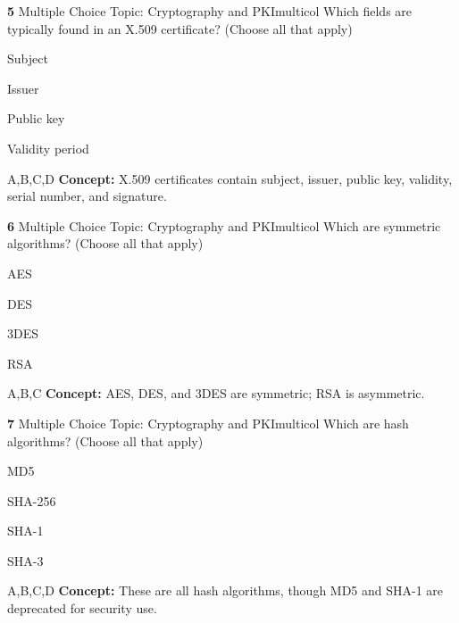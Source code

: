 \documentclass[10pt,a4paper]{article}
\begin{document}
\begin{qcard}{\color{white}\textbf{5} \hfill \small Multiple Choice \textbar{} Topic: Cryptography and PKI}{multicol}
Which fields are typically found in an X.509 certificate? (Choose all that apply)

\begin{qoptions}
\item Subject
\item Issuer
\item Public key
\item Validity period
\end{qoptions}
\begin{explainbox}{A,B,C,D}
\textbf{Concept:} X.509 certificates contain subject, issuer, public key, validity, serial number, and signature.
\end{explainbox}
\end{qcard}

\begin{qcard}{\color{white}\textbf{6} \hfill \small Multiple Choice \textbar{} Topic: Cryptography and PKI}{multicol}
Which are symmetric algorithms? (Choose all that apply)

\begin{qoptions}
\item AES
\item DES
\item 3DES
\item RSA
\end{qoptions}
\begin{explainbox}{A,B,C}
\textbf{Concept:} AES, DES, and 3DES are symmetric; RSA is asymmetric.
\end{explainbox}
\end{qcard}

\begin{qcard}{\color{white}\textbf{7} \hfill \small Multiple Choice \textbar{} Topic: Cryptography and PKI}{multicol}
Which are hash algorithms? (Choose all that apply)

\begin{qoptions}
\item MD5
\item SHA-256
\item SHA-1
\item SHA-3
\end{qoptions}
\begin{explainbox}{A,B,C,D}
\textbf{Concept:} These are all hash algorithms, though MD5 and SHA-1 are deprecated for security use.
\end{explainbox}
\end{qcard}
\end{document}
